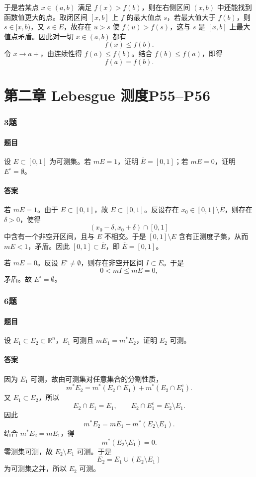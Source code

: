 \documentclass{article}
\begin{document}
	于是若某点 $x\in(a,b)$ 满足 $f(x)>f(b)$，则在右侧区间 $(x,b)$ 中还能找到函数值更大的点。取闭区间 $[x,b]$ 上 $f$ 的最大值点 $s$，若最大值大于 $f(b)$，则 $s\in[x,b)$，又 $s\in E$，故存在 $u>s$ 使 $f(u)>f(s)$，这与 $s$ 是 $[x,b]$ 上最大值点矛盾。因此对一切 $x\in(a,b)$ 都有
	\[
	f(x)\le f(b).
	\]
	令 $x\to a+$，由连续性得 $f(a)\le f(b)$。结合 $f(b)\le f(a)$，即得
	\[
	f(a)=f(b).
	\]
	
	\section*{第二章 \quad Lebesgue 测度\quad P55--P56}
	
	\subsubsection*{3题}
	\paragraph{题目} 设 $E\subset[0,1]$ 为可测集。若 $mE=1$，证明 $\overline E=[0,1]$；若 $mE=0$，证明 $E^\circ=\emptyset$。
	
	\paragraph{答案} 若 $mE=1$。由于 $E\subset[0,1]$，故 $\overline E\subset[0,1]$。反设存在 $x_0\in[0,1]\setminus\overline E$，则存在 $\delta>0$，使得
	\[
	(x_0-\delta,x_0+\delta)\cap[0,1]
	\]
	中含有一个非空开区间，且与 $E$ 不相交。于是 $[0,1]\setminus E$ 含有正测度子集，从而 $mE<1$，矛盾。因此 $[0,1]\subset\overline E$，即 $\overline E=[0,1]$。
	
	若 $mE=0$。反设 $E^\circ\neq\emptyset$，则存在非空开区间 $I\subset E$。于是
	\[
	0<mI\le mE=0,
	\]
	矛盾。故 $E^\circ=\emptyset$。
	
	\subsubsection*{6题}
	\paragraph{题目} 设 $E_1\subset E_2\subset\mathbb{R}^n$，$E_1$ 可测且 $mE_1=m^*E_2$，证明 $E_2$ 可测。
	
	\paragraph{答案} 因为 $E_1$ 可测，故由可测集对任意集合的分割性质，
	\[
	m^*E_2=m^*(E_2\cap E_1)+m^*(E_2\cap E_1^c).
	\]
	又 $E_1\subset E_2$，所以
	\[
	E_2\cap E_1=E_1,\qquad E_2\cap E_1^c=E_2\setminus E_1.
	\]
	因此
	\[
	m^*E_2=mE_1+m^*(E_2\setminus E_1).
	\]
	结合 $m^*E_2=mE_1$，得
	\[
	m^*(E_2\setminus E_1)=0.
	\]
	零测集可测，故 $E_2\setminus E_1$ 可测。于是
	\[
	E_2=E_1\cup(E_2\setminus E_1)
	\]
	为可测集之并，所以 $E_2$ 可测。
	
\end{document}
